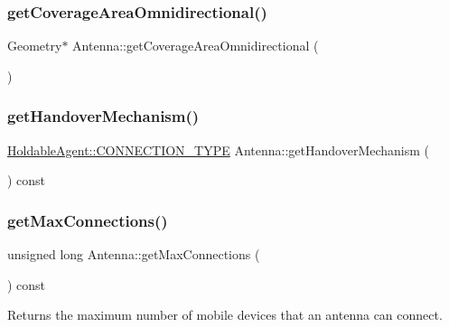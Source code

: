 \mbox{\label{class_antenna_adaca77948cf68db3348e2819264767f6}} 
\subsubsection{\texorpdfstring{get\+Coverage\+Area\+Omnidirectional()}{getCoverageAreaOmnidirectional()}}
{\footnotesize\ttfamily Geometry$\ast$ Antenna\+::get\+Coverage\+Area\+Omnidirectional (\begin{DoxyParamCaption}{ }\end{DoxyParamCaption})\hspace{0.3cm}{\ttfamily [private]}}

\mbox{\label{class_antenna_a35001fa0ad0e015c275d08ac84d2982b}} 
\subsubsection{\texorpdfstring{get\+Handover\+Mechanism()}{getHandoverMechanism()}}
{\footnotesize\ttfamily \hyperlink{class_holdable_agent_ae2c334b004d7b9c5a999cf2618e4e518}{Holdable\+Agent\+::\+C\+O\+N\+N\+E\+C\+T\+I\+O\+N\+\_\+\+T\+Y\+PE} Antenna\+::get\+Handover\+Mechanism (\begin{DoxyParamCaption}{ }\end{DoxyParamCaption}) const}

\mbox{\label{class_antenna_ac7d42215283cd7d4dc16d449f61af91d}} 
\subsubsection{\texorpdfstring{get\+Max\+Connections()}{getMaxConnections()}}
{\footnotesize\ttfamily unsigned long Antenna\+::get\+Max\+Connections (\begin{DoxyParamCaption}{ }\end{DoxyParamCaption}) const}

Returns the maximum number of mobile devices that an antenna can connect. \mbox{\label{class_antenna_a1c6126c232ee496b9b693fc20e4892f5}} 
